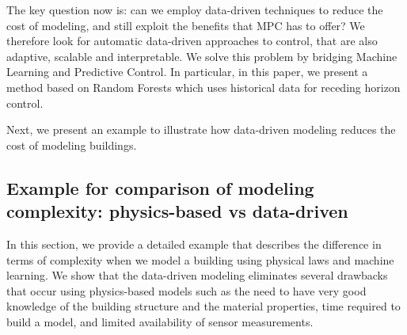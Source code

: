 \textcolor[rgb]{0,0,1}{The key question now is: can we employ data-driven techniques to reduce the cost of modeling, and still exploit the benefits that MPC has to offer?
We therefore look for automatic data-driven approaches to control, that are also adaptive, scalable and interpretable.
We solve this problem by bridging Machine Learning and Predictive Control. In particular, in this paper, we present a method based on Random Forests which uses historical data for receding horizon control.}

\textcolor[rgb]{0,0,1}{
Next, we present an example to illustrate how data-driven modeling reduces the cost of modeling buildings. 
}


\subsection{Example for comparison of modeling complexity: physics-based vs data-driven}
\textcolor[rgb]{0,0,1}{In this section, we provide a detailed example that describes the difference in terms of complexity when we model a building using physical laws and machine learning.
We show that the data-driven modeling eliminates several drawbacks that occur using physics-based models such as the need to have very good knowledge of the building structure and the material properties, time required to build a model, and limited availability of sensor measurements.}

